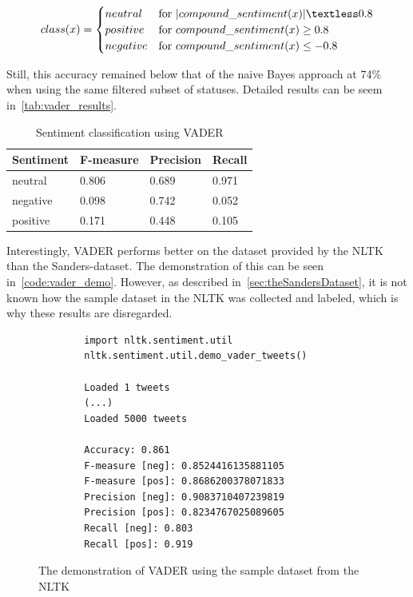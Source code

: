 \begin{equation}
    class(x) =
    \begin{cases}
        neutral & \text{for } |compound\_sentiment(x)| \textless 0.8 \\
        positive & \text{for } compound\_sentiment(x) \geq 0.8 \\
        negative & \text{for } compound\_sentiment(x) \leq -0.8 \\
    \end{cases}
\end{equation}

Still, this accuracy remained below that of the naive Bayes approach at 74\% when using the same filtered subset of statuses.
Detailed results can be seem in~\autoref{tab:vader_results}.

\begin{table}
    \caption{Sentiment classification using VADER}
    \label{tab:vader_results}
    \centering
    \begin{tabular}{llll} %
        \toprule
        Sentiment
        & F-measure
        & Precision
        & Recall
        \\\midrule
        neutral & 0.806 & 0.689 & 0.971
        \\\midrule
        negative & 0.098 & 0.742 & 0.052
        \\\midrule
        positive & 0.171 & 0.448 & 0.105
        \\\bottomrule
    \end{tabular}
\end{table}

Interestingly, VADER performs better on the dataset provided by the NLTK than the Sanders-dataset.
The demonstration of this can be seen in~\autoref{code:vader_demo}.
However, as described in~\autoref{sec:theSandersDataset}, it is not known how the sample dataset in the NLTK was collected and labeled,
which is why these results are disregarded.

\begin{figure}
    \caption{The demonstration of VADER using the sample dataset from the NLTK}
    \label{code:vader_demo}
    \begin{verbatim}
        import nltk.sentiment.util
        nltk.sentiment.util.demo_vader_tweets()

        Loaded 1 tweets
        (...)
        Loaded 5000 tweets

        Accuracy: 0.861
        F-measure [neg]: 0.8524416135881105
        F-measure [pos]: 0.8686200378071833
        Precision [neg]: 0.9083710407239819
        Precision [pos]: 0.8234767025089605
        Recall [neg]: 0.803
        Recall [pos]: 0.919
    \end{verbatim}
\end{figure}

